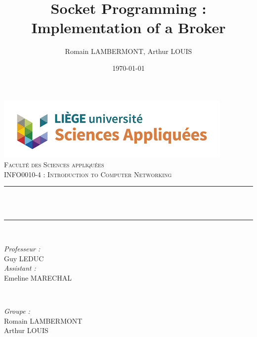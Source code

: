 \documentclass{article}
\begin{document}

 \title{Socket Programming : Implementation of a Broker}								%
 \author{Romain LAMBERMONT, Arthur LOUIS}								%
 \date{\today}											%

 \makeatletter
 \let\thetitle\@title
 \let\theauthor\@author
 \let\thedate\@date
 \makeatother

 \pagestyle{fancy}
 \fancyhf{}
 \rhead{\theauthor}
 \lhead{\thetitle}
 \cfoot{\thepage}

 \begin{titlepage}
 	\centering
     \vspace*{0.5 cm}
     \includegraphics[scale = 0.7]{facsa.png}\\[1.0 cm]	%
     \textsc{\LARGE \newline\newline Faculté des Sciences appliquées}\\[2.0 cm]	%
 	\textsc{\Large  INFO0010-4 : Introduction to Computer Networking}\\[0.5 cm]				%
 	\rule{\linewidth}{0.2 mm} \\[0.4 cm]
 	{ \huge \bfseries \thetitle}\\
 	\rule{\linewidth}{0.2 mm} \\[1.5 cm]

 	\begin{minipage}{0.5\textwidth}
 		\begin{flushleft} \large
 			\emph{Professeur :}\\
 			Guy LEDUC\\
            \vspace{0.5cm}
            \emph{Assistant :}\\
            Emeline MARECHAL\\
 			\end{flushleft}
 			\end{minipage}~
 			\begin{minipage}{0.4\textwidth}

 			\begin{flushright} \large
 			\emph{Groupe :} \\
 			Romain LAMBERMONT\\
            Arthur LOUIS\\
 		\end{flushright}

 	\end{minipage}\\[2 cm]


     \thedate
 \end{titlepage}
\end{document}
